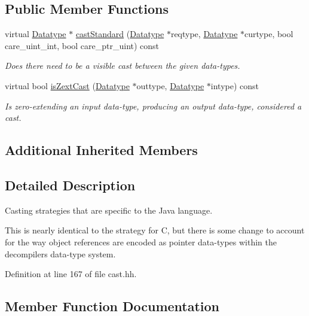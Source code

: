 \subsection*{Public Member Functions}
\begin{DoxyCompactItemize}
\item 
virtual \mbox{\hyperlink{class_datatype}{Datatype}} $\ast$ \mbox{\hyperlink{class_cast_strategy_java_a6a9d4ec935035f52d214326cb6e0a33f}{cast\+Standard}} (\mbox{\hyperlink{class_datatype}{Datatype}} $\ast$reqtype, \mbox{\hyperlink{class_datatype}{Datatype}} $\ast$curtype, bool care\+\_\+uint\+\_\+int, bool care\+\_\+ptr\+\_\+uint) const
\begin{DoxyCompactList}\small\item\em Does there need to be a visible cast between the given data-\/types. \end{DoxyCompactList}\item 
virtual bool \mbox{\hyperlink{class_cast_strategy_java_a6c8536d19ca90746652c78d0781e98b6}{is\+Zext\+Cast}} (\mbox{\hyperlink{class_datatype}{Datatype}} $\ast$outtype, \mbox{\hyperlink{class_datatype}{Datatype}} $\ast$intype) const
\begin{DoxyCompactList}\small\item\em Is zero-\/extending an input data-\/type, producing an output data-\/type, considered a cast. \end{DoxyCompactList}\end{DoxyCompactItemize}
\subsection*{Additional Inherited Members}


\subsection{Detailed Description}
Casting strategies that are specific to the Java language. 

This is nearly identical to the strategy for C, but there is some change to account for the way object references are encoded as pointer data-\/types within the decompiler\textquotesingle{}s data-\/type system. 

Definition at line 167 of file cast.\+hh.



\subsection{Member Function Documentation}
\mbox{\label{class_cast_strategy_java_a6a9d4ec935035f52d214326cb6e0a33f}} 
